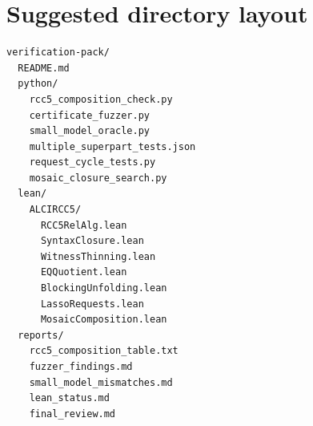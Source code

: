 \documentclass[11pt]{article}
\theoremstyle{definition}
\theoremstyle{plain}
\begin{document}
\section{Suggested directory layout}

\begin{lstlisting}
verification-pack/
  README.md
  python/
    rcc5_composition_check.py
    certificate_fuzzer.py
    small_model_oracle.py
    multiple_superpart_tests.json
    request_cycle_tests.py
    mosaic_closure_search.py
  lean/
    ALCIRCC5/
      RCC5RelAlg.lean
      SyntaxClosure.lean
      WitnessThinning.lean
      EQQuotient.lean
      BlockingUnfolding.lean
      LassoRequests.lean
      MosaicComposition.lean
  reports/
    rcc5_composition_table.txt
    fuzzer_findings.md
    small_model_mismatches.md
    lean_status.md
    final_review.md
\end{lstlisting}
\end{document}
